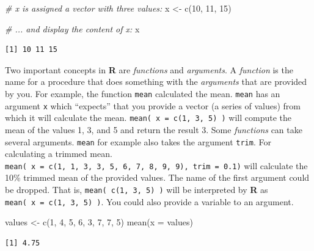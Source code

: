 \documentclass[
]{book}
\newenvironment{Shaded}{\begin{snugshade}}{\end{snugshade}}
\newcommand{\AttributeTok}[1]{\textcolor[rgb]{0.77,0.63,0.00}{#1}}
\newcommand{\CommentTok}[1]{\textcolor[rgb]{0.56,0.35,0.01}{\textit{#1}}}
\newcommand{\DecValTok}[1]{\textcolor[rgb]{0.00,0.00,0.81}{#1}}
\newcommand{\FunctionTok}[1]{\textcolor[rgb]{0.00,0.00,0.00}{#1}}
\newcommand{\NormalTok}[1]{#1}
\newcommand{\OtherTok}[1]{\textcolor[rgb]{0.56,0.35,0.01}{#1}}
\begin{document}
\begin{Shaded}
\begin{Highlighting}[]
\CommentTok{\# x is assigned a vector with three values:}
\NormalTok{x }\OtherTok{\textless{}{-}} \FunctionTok{c}\NormalTok{(}\DecValTok{10}\NormalTok{, }\DecValTok{11}\NormalTok{, }\DecValTok{15}\NormalTok{)}

\CommentTok{\# ... and display the content of x:}
\NormalTok{x}
\end{Highlighting}
\end{Shaded}

\begin{verbatim}
[1] 10 11 15
\end{verbatim}

Two important concepts in \textbf{R} are \emph{functions} and \emph{arguments}. A \emph{function} is the name for a procedure that does something with the \emph{arguments} that are provided by you. For example, the function \texttt{mean} calculated the mean. \texttt{mean} has an argument \texttt{x} which ``expects'' that you provide a vector (a series of values) from which it will calculate the mean. \texttt{mean(\ x\ =\ c(1,\ 3,\ 5)\ )} will compute the mean of the values 1, 3, and 5 and return the result 3. Some \emph{functions} can take several arguments. \texttt{mean} for example also takes the argument \texttt{trim}. For calculating a trimmed mean. \texttt{mean(\ x\ =\ c(1,\ 1,\ 3,\ 3,\ 5,\ 6,\ 7,\ 8,\ 9,\ 9),\ trim\ =\ 0.1)} will calculate the 10\% trimmed mean of the provided values. The name of the first argument could be dropped. That is, \texttt{mean(\ c(1,\ 3,\ 5)\ )} will be interpreted by \textbf{R} as \texttt{mean(\ x\ =\ c(1,\ 3,\ 5)\ )}. You could also provide a variable to an argument.

\begin{Shaded}
\begin{Highlighting}[]
\NormalTok{values }\OtherTok{\textless{}{-}} \FunctionTok{c}\NormalTok{(}\DecValTok{1}\NormalTok{, }\DecValTok{4}\NormalTok{, }\DecValTok{5}\NormalTok{, }\DecValTok{6}\NormalTok{, }\DecValTok{3}\NormalTok{, }\DecValTok{7}\NormalTok{, }\DecValTok{7}\NormalTok{, }\DecValTok{5}\NormalTok{)}
\FunctionTok{mean}\NormalTok{(}\AttributeTok{x =}\NormalTok{ values)}
\end{Highlighting}
\end{Shaded}

\begin{verbatim}
[1] 4.75
\end{verbatim}
\end{document}
